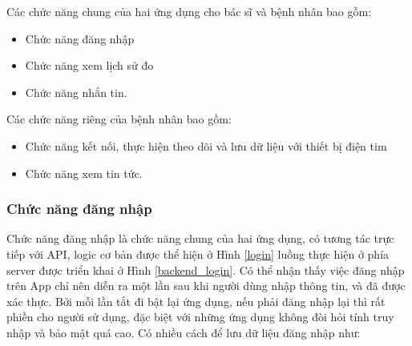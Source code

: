 Các chức năng chung của hai ứng dụng cho bác sĩ và bệnh nhân bao gồm: 

\begin{adjustwidth}{1.5em}{}
\begin{itemize}
  \item Chức năng đăng nhập
  \item Chức năng xem lịch sử đo
  \item Chức năng nhắn tin.
\end{itemize}
\end{adjustwidth}

Các chức năng riêng của bệnh nhân bao gồm:
\begin{adjustwidth}{1.5em}{}
\begin{itemize}
  \item Chức năng kết nối, thực hiện theo dõi và lưu dữ liệu với thiết bị điện tim
  \item Chức năng xem tin tức.
\end{itemize}
\end{adjustwidth}
\subsubsection{Chức năng đăng nhập}


Chức năng đăng nhập là chức năng chung của hai ứng dụng, có tương tác trực tiếp với API, logic cơ bản được thể hiện ở Hình \ref{login}
luồng thực hiện ở phía server được triển khai ở 
Hình \ref{backend_login}. Có thể nhận thấy việc đăng nhập trên App chỉ nên diễn ra một lần sau khi người dùng nhập thông tin,
và đã được xác thực. Bởi mỗi lần tắt đi bật lại ứng dụng, nếu phải đăng nhập lại thì rất phiền cho người sử dụng, đặc biệt
với những ứng dụng không đòi hỏi tính truy nhập và bảo mật quá cao. Có nhiều cách để lưu dữ liệu đăng nhập như:

